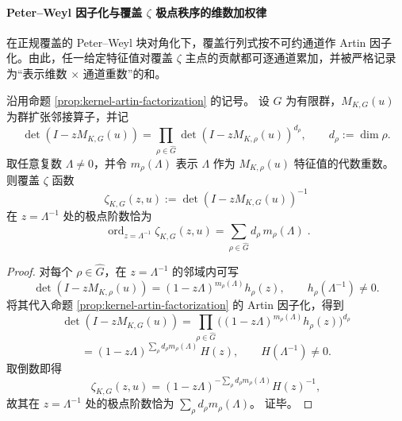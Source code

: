 \paragraph{Peter--Weyl 因子化与覆盖 \texorpdfstring{$\zeta$}{zeta} 极点秩序的维数加权律}
在正规覆盖的 Peter--Weyl 块对角化下，覆盖行列式按不可约通道作 Artin 因子化。由此，任一给定特征值对覆盖 \(\zeta\) 主点的贡献都可逐通道累加，并被严格记录为“表示维数 \(\times\) 通道重数”的和。

\begin{theorem}\label{thm:xi-time-part64-cover-zeta-pole-order-weighted-channel-multiplicity}
沿用命题 \ref{prop:kernel-artin-factorization} 的记号。
设 \(G\) 为有限群，\(M_{K,G}(u)\) 为群扩张邻接算子，并记
\[
\det(I-zM_{K,G}(u))
=
\prod_{\rho\in\widehat G}
\det(I-zM_{K,\rho}(u))^{d_\rho},
\qquad
d_\rho:=\dim\rho.
\]
取任意复数 \(\Lambda\neq 0\)，并令 \(m_\rho(\Lambda)\) 表示 \(\Lambda\) 作为 \(M_{K,\rho}(u)\) 特征值的代数重数。
则覆盖 \(\zeta\) 函数
\[
\zeta_{K,G}(z,u):=\det(I-zM_{K,G}(u))^{-1}
\]
在 \(z=\Lambda^{-1}\) 处的极点阶数恰为
\[
\boxed{\;
\operatorname{ord}_{z=\Lambda^{-1}}\zeta_{K,G}(z,u)
=
\sum_{\rho\in\widehat G} d_\rho\,m_\rho(\Lambda)\; }.
\]
\end{theorem}
\begin{proof}
对每个 \(\rho\in\widehat G\)，在 \(z=\Lambda^{-1}\) 的邻域内可写
\[
\det(I-zM_{K,\rho}(u))
=(1-z\Lambda)^{m_\rho(\Lambda)}h_\rho(z),
\qquad
h_\rho(\Lambda^{-1})\neq 0.
\]
将其代入命题 \ref{prop:kernel-artin-factorization} 的 Artin 因子化，得到
\[
\det(I-zM_{K,G}(u))
=
\prod_{\rho\in\widehat G}
\bigl((1-z\Lambda)^{m_\rho(\Lambda)}h_\rho(z)\bigr)^{d_\rho}
\]
\[
=(1-z\Lambda)^{\sum_{\rho}d_\rho m_\rho(\Lambda)}\,H(z),
\qquad
H(\Lambda^{-1})\neq 0.
\]
取倒数即得
\[
\zeta_{K,G}(z,u)
=(1-z\Lambda)^{-\sum_{\rho}d_\rho m_\rho(\Lambda)}H(z)^{-1},
\]
故其在 \(z=\Lambda^{-1}\) 处的极点阶数恰为
\(
\sum_{\rho}d_\rho m_\rho(\Lambda)
\)。
证毕。
\end{proof}

